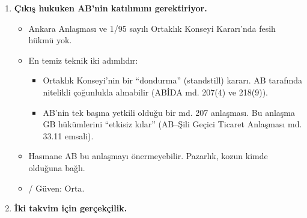 \begin{enumerate}
  \begin{itemize}
  \tightlist
  \item
    AB'nin Türkiye'ye ihracatındaki kayıp (σ = 5, kısmi denge) rejime göre değişiyor:

    \begin{itemize}
    \tightlist
    \item
      yalnızca MFN uygulanırsa \$16,4 mlr;
    \item
      seçici rejimde (c) \$18,7 mlr;
    \item
      İGV kabiliyete duyarlı biçimde AB'ye de uygulanırsa (c2) \$28,5 mlr.
    \end{itemize}
  \item
    Türkiye, AB'nin üçüncü büyük yeni araç ihracat pazarı: 2025'te €18,8 mlr.
  \item
    Enflasyonu kendi araçlarıyla nötrleyebilen bir Türkiye için anlaşmasızlık daha az korkutucudur. Bu, anlaşmasız alternatifini (BATNA) güçlendirir.
  \item
    \etiketT{}/\etiketH{} Güven: Orta.
  \end{itemize}
\item
  \textbf{Çıkış hukuken AB'nin katılımını gerektiriyor.}

  \begin{itemize}
  \tightlist
  \item
    Ankara Anlaşması ve 1/95 sayılı Ortaklık Konseyi Kararı'nda fesih hükmü yok.
  \item
    En temiz teknik iki adımlıdır:

    \begin{itemize}
    \tightlist
    \item
      Ortaklık Konseyi'nin bir ``dondurma'' (standstill) kararı. AB tarafında nitelikli çoğunlukla alınabilir (ABİDA md. 207(4) ve 218(9)).
    \item
      AB'nin tek başına yetkili olduğu bir md. 207 anlaşması. Bu anlaşma GB hükümlerini ``etkisiz kılar'' (AB--Şili Geçici Ticaret Anlaşması md. 33.11 emsali).
    \end{itemize}
  \item
    Hasmane AB bu anlaşmayı önermeyebilir. Pazarlık, kozun kimde olduğuna bağlı.
  \item
    \etiketV{}/\etiketH{} Güven: Orta.
  \end{itemize}
\item
  \textbf{İki takvim için gerçekçilik.}


\end{enumerate}
